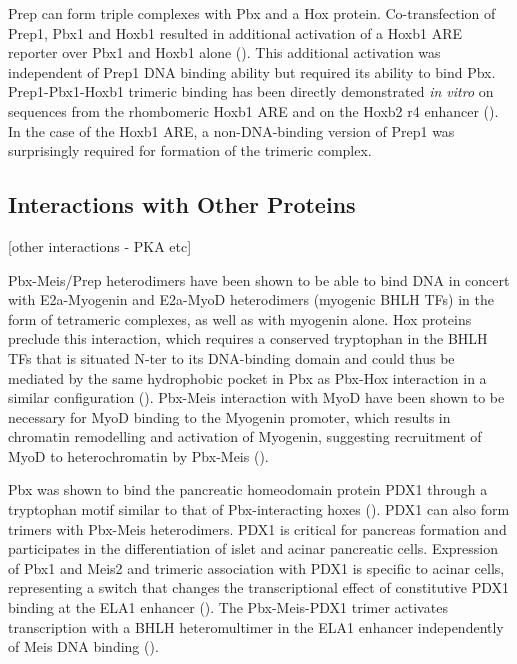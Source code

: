 
Prep can form triple complexes with Pbx and a Hox protein. Co-transfection of Prep1, Pbx1 and Hoxb1 resulted in additional activation of a Hoxb1 \ac{ARE} reporter over Pbx1 and Hoxb1 alone (\cite{Berthelsen1998}). This additional activation was independent of Prep1 DNA binding ability but required its ability to bind Pbx. Prep1-Pbx1-Hoxb1 trimeric binding has been directly demonstrated \textit{in vitro} on sequences from the rhombomeric Hoxb1 \ac{ARE} and on the Hoxb2 r4 enhancer (\cite{Ferretti2000}). In the case of the Hoxb1 \ac{ARE}, a non-DNA-binding version of Prep1 was surprisingly required for formation of the trimeric complex. %

\subsection{Interactions with Other Proteins}
[other interactions - PKA etc]

Pbx-Meis/Prep heterodimers have been shown to be able to bind DNA in concert with E2a-Myogenin and E2a-MyoD heterodimers (myogenic \ac{BHLH} \acp{TF}) in the form of tetrameric complexes, as well as with myogenin alone. Hox proteins preclude this interaction, which requires a conserved tryptophan in the \ac{BHLH} \acp{TF} that is situated \ac{N-ter} to its DNA-binding domain and could thus be mediated by the same hydrophobic pocket in Pbx as Pbx-Hox interaction in a similar configuration (\cite{Knoepfler1999}). Pbx-Meis interaction with MyoD have been shown to be necessary for MyoD binding to the Myogenin promoter, which results in chromatin remodelling and activation of Myogenin, suggesting recruitment of MyoD to heterochromatin by Pbx-Meis (\cite{Berkes2004}).


Pbx was shown to bind the pancreatic homeodomain protein PDX1 through a tryptophan motif similar to that of Pbx-interacting hoxes (\cite{Peers1995}). PDX1 can also form trimers with Pbx-Meis heterodimers. PDX1 is critical for pancreas formation and participates in the differentiation of islet and acinar pancreatic cells. Expression of Pbx1 and Meis2 and trimeric association with PDX1 is specific to acinar cells, representing a switch that changes the transcriptional effect of constitutive PDX1 binding at the ELA1 enhancer (\cite{Swift1998}). The Pbx-Meis-PDX1 trimer activates transcription with a \ac{BHLH} heteromultimer in the ELA1 enhancer independently of Meis DNA binding (\cite{Liu2001}).

